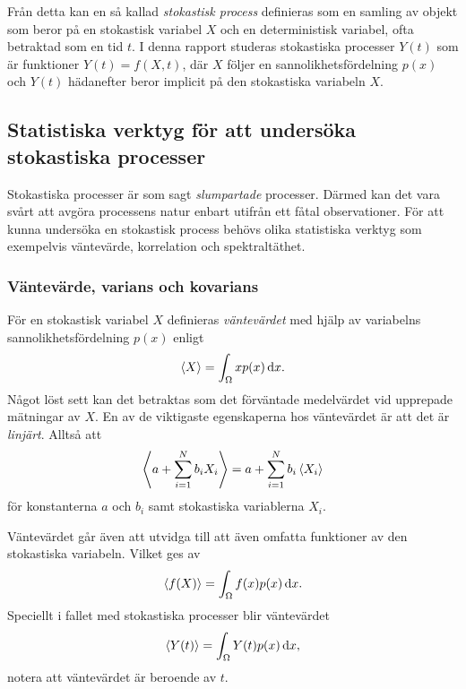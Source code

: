 Från detta kan en så kallad \emph{stokastisk process} definieras som en
samling av objekt som beror på en stokastisk variabel $X$ och en
deterministisk variabel, ofta betraktad som en tid\footnotemark{}
$t$. I denna rapport studeras stokastiska processer $Y(t)$ som är funktioner $Y(t) = f(X,t)$, där $X$ följer en sannolikhetsfördelning $p(x)$ och $Y(t)$ hädanefter beror implicit på den stokastiska variabeln $X$.

\subsection{Statistiska verktyg för att undersöka stokastiska processer}
Stokastiska processer är som sagt \emph{slumpartade} processer. Därmed kan
det vara svårt att avgöra processens natur enbart utifrån ett fåtal
observationer. För att kunna undersöka en stokastisk process
behövs olika statistiska verktyg som exempelvis väntevärde, korrelation och spektraltäthet.

\subsubsection{Väntevärde, varians och kovarians}
För en stokastisk variabel $X$ definieras \emph{väntevärdet} med hjälp av variabelns sannolikhetsfördelning $p(x)$ enligt
\begin{equation}\label{eq:EV}
    \ev{X} = \int_{\Omega} x p(x) \id{x}.
\end{equation}
Något löst sett kan det betraktas som det förväntade medelvärdet vid upprepade mätningar av $X$. En av de viktigaste egenskaperna hos väntevärdet är att det är \emph{linjärt}. Alltså att~\cite{Rice_matstat2006}
\begin{equation}\label{eq:EV_linkomb}
\ev{a+\sum_{i=1}^N b_i X_i} = a+\sum_{i=1}^N b_i \ev{X_i}
\end{equation}
för konstanterna $a$ och $b_i$ samt stokastiska variablerna $X_i$. 

Väntevärdet går även att utvidga till att även omfatta funktioner av
den stokastiska variabeln. Vilket ges av~\cite{Rice_matstat2006}
\begin{equation}\label{eq:EV_f}
    \ev{f(X)} = \int_{\Omega} f(x) p(x) \id{x}.
\end{equation}
Speciellt i fallet med stokastiska processer blir väntevärdet 
\begin{equation}\label{eq:EV_process}
    \ev{Y(t)} = \int_{\Omega} Y(t)p(x) \id{x},
\end{equation}
notera att väntevärdet är beroende av $t$. 

